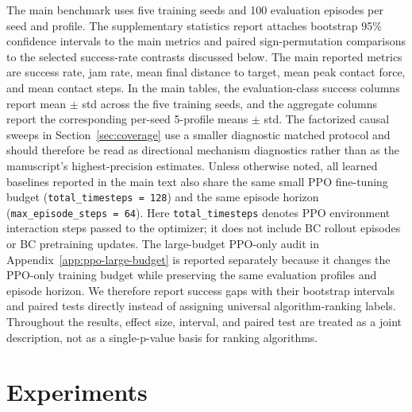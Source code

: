 ﻿\documentclass[11pt]{article}
\newcommand{\code}[1]{\nolinkurl{#1}}
\begin{document}
The main benchmark uses five training seeds and 100 evaluation episodes per seed and profile.
The supplementary statistics report attaches bootstrap 95\% confidence intervals to the main
metrics and paired sign-permutation comparisons to the selected success-rate contrasts discussed
below. The main reported metrics are success rate, jam rate, mean final distance to target, mean
peak contact force, and mean contact steps. In the main tables, the evaluation-class success
columns report mean $\pm$ std across the five training seeds, and the aggregate columns report the
corresponding per-seed 5-profile means $\pm$ std. The factorized causal sweeps in
Section~\ref{sec:coverage} use a smaller diagnostic matched protocol and should therefore be read
as directional mechanism diagnostics rather than as the manuscript's highest-precision estimates.
Unless otherwise noted, all learned baselines reported in the main text also share the same
small PPO fine-tuning budget (\code{total\_timesteps = 128}) and the same episode horizon
(\code{max\_episode\_steps = 64}). Here \code{total\_timesteps} denotes PPO environment
interaction steps passed to the optimizer; it does not include BC rollout episodes or BC
pretraining updates. The large-budget PPO-only audit in Appendix~\ref{app:ppo-large-budget} is
reported separately because it changes the PPO-only training budget while preserving the same
evaluation profiles and episode horizon. We therefore report success gaps with their bootstrap
intervals and paired tests directly instead of assigning universal algorithm-ranking labels.
Throughout the results, effect size, interval, and paired test are treated as a joint description,
not as a single-p-value basis for ranking algorithms.

\section{Experiments}
\label{sec:experiments}
\end{document}

